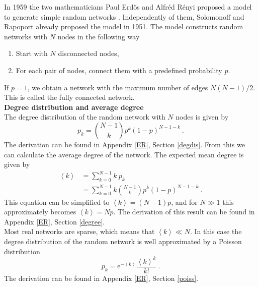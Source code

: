 \documentclass[11 pt , letterpaper , twoside , openright]{book}
\begin{document}
In 1959 the two mathematicians Paul Erd\H{o}s and Alfr\'{e}d R\'{e}nyi proposed a model to generate simple random networks \cite{F.Costa2007}. Independently of them, Solomonoff and Rapoport already proposed the model in 1951. The model constructs random networks with $N$ nodes in the following way \cite{Albert2002}
\begin{enumerate}
	\item Start with $N$ disconnected nodes,
	\item For each pair of nodes, connect them with a predefined probability $p$.
\end{enumerate} 
If $p=1$, we obtain a network with the maximum number of edges $N(N-1)/2$. This is called the fully connected network.\\
\newline
\textbf{Degree distribution and average degree}\\
\newline
The degree distribution of the random network with $N$ nodes is given by
\begin{equation}\label{degDistRan}
	p_k = \binom{N-1}{k}p^k (1-p)^{N-1-k} \ .
\end{equation}
The derivation can be found in Appendix \ref{ER}, Section \ref{degdis}. From this we can calculate the average degree of the network. The expected mean degree is given by \cite{Hopcroft2006}
\begin{equation}\label{avDeg}
\begin{split}
	\left<k\right> &= \sum_{k=0}^{N-1} k\  p_k  \\
&= \sum_{k=0}^{N-1} k \binom{N-1}{k}p^k (1-p)^{N-1-k} \ .
\end{split}
\end{equation}
This equation can be simplified to $\left<k\right> = (N-1)p$, and for $N \gg 1$ this approximately becomes $\left<k\right> = Np$. The derivation of this result can be found in Appendix \ref{ER}, Section \ref{degree}.\\
\newline
Most real networks are sparse, which means that $\left<k\right> \ll N$. In this case the degree distribution of the random network is well approximated by a Poisson distribution \cite{Albert2014} 
\begin{equation}
	p_k = \mathrm{e}^{-\left<k\right>} \frac{\left<k\right>^k}{k!} \ .
\end{equation}
The derivation can be found in Appendix \ref{ER}, Section \ref{poiss}. \\
\newline
\end{document}
